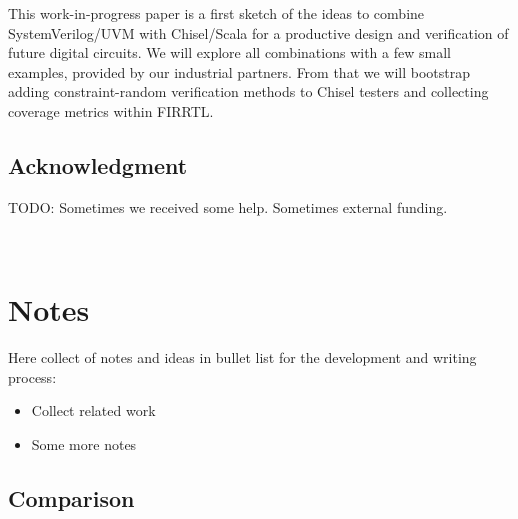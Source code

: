 \documentclass[a4paper, conference]{IEEEtran}
\newcommand{\todo}[1]{{\color{olive} TODO: #1}}
\begin{document}
This work-in-progress paper is a first sketch of the ideas to combine SystemVerilog/UVM
with Chisel/Scala for a productive design and verification of future digital circuits.
We will explore all combinations with a few small examples, provided by our industrial
partners.
From that we will bootstrap adding constraint-random verification methods to Chisel
testers and collecting coverage metrics within FIRRTL.

\subsection*{Acknowledgment}

\todo{Sometimes we received some help. Sometimes external funding.}


~
\newpage


\section{Notes}

Here collect of notes and ideas in bullet list for the development and writing process:

\begin{itemize}
\item Collect related work
\item Some more notes
\end{itemize}

\subsection{Comparison}
\end{document}
